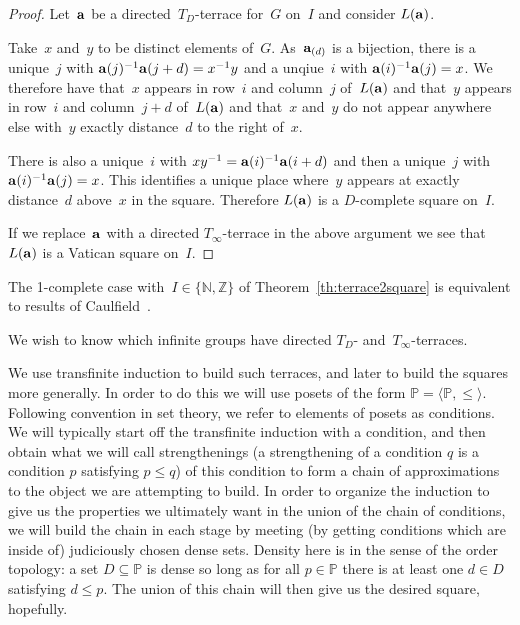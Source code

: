 \documentclass[12pt,a4paper]{article}
\newcommand{\Z}{\mathbb{Z}}
\newcommand{\N}{\mathbb{N}}
\renewcommand{\P}{\mathbb{P}}
\begin{document}
\begin{proof}
Let~${\bf a}$ be a directed~$T_D$-terrace for~$G$ on~$I$ and consider $L({\bf a})$.

Take~$x$ and~$y$ to be distinct elements of~$G$.  As~${\bf a}_{(d)}$ is a bijection, there is a unique~$j$ with ${\bf a}(j)^{-1}{\bf a}(j+d) = x^{-1}y$ and a unqiue~$i$ with ${\bf a}(i)^{-1}{\bf a}(j)=x$.  We therefore have that~$x$ appears in row~$i$ and column~$j$ of~$L({\bf a})$ and that~$y$ appears in row~$i$ and column~$j+d$ of~$L({\bf a})$ and that~$x$ and~$y$ do not appear anywhere else with~$y$ exactly distance~$d$  to the right of~$x$.

There is also a unique~$i$ with $xy^{-1} = {\bf a}(i)^{-1}{\bf a}(i+d)$ and then a unique~$j$ with ${\bf a}(i)^{-1}{\bf a}(j)=x$.  This identifies a unique place where~$y$ appears at exactly distance~$d$ above~$x$ in the square.  Therefore $L({\bf a})$ is a $D$-complete square on~$I$.

If we replace~${\bf a}$ with a directed $T_{\infty}$-terrace in the above argument we see that~$L({\bf a})$ is a Vatican square on~$I$.
\end{proof}

The 1-complete case with~$I \in \{ \N, \Z \}$ of Theorem~\ref{th:terrace2square} is equivalent to results of Caulfield~\cite{Caulfield96}.

We wish to know which infinite groups have directed $T_D$- and~$T_{\infty}$-terraces.  

We use transfinite induction to build such terraces, and later to build the squares more generally. In order to do this we will use posets of the form $\P=\langle \P, \leq\rangle$. Following convention in set theory, we refer to elements of posets as conditions. We will typically start off the transfinite induction with a condition, and then obtain what we will call strengthenings (a strengthening of a condition $q$ is a condition $p$ satisfying $p\leq q$) of this condition to form a chain of approximations to the object we are attempting to build. In order to organize the induction to give us the properties we ultimately want in the union of the chain of conditions, we will build the chain in each stage by meeting (by getting conditions which are inside of) judiciously chosen dense sets. Density here is in the sense of the order topology: a set $D \subseteq \P$ is dense so long as for all $p \in \P$ there is at least one $d \in D$ satisfying $d\leq p$. The union of this chain will then give us the desired square, hopefully. 
\end{document}
